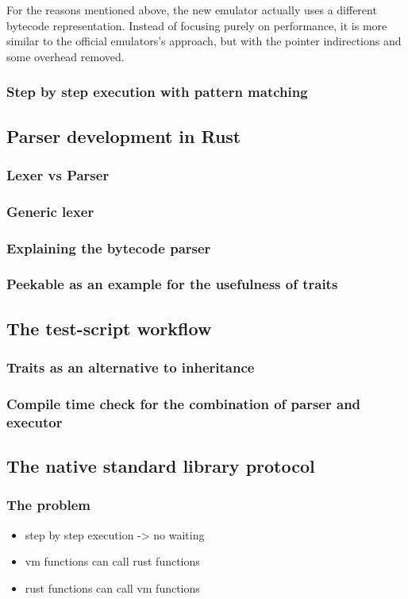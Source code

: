 For the reasons mentioned above, the new emulator actually uses a different bytecode representation. Instead of focusing purely on performance, it is more similar to the official emulators's approach, but with the pointer indirections and some overhead removed.

\subsubsection{Step by step execution with pattern matching}
\subsection{Parser development in Rust}
\subsubsection{Lexer vs Parser}
\subsubsection{Generic lexer}
\subsubsection{Explaining the bytecode parser}
\subsubsection{Peekable as an example for the usefulness of traits}
\subsection{The test-script workflow}
\subsubsection{Traits as an alternative to inheritance}
\subsubsection{Compile time check for the combination of parser and executor}
\subsection{The native standard library protocol} \label{jack-stdlib-in-rust}
\subsubsection{The problem}
\begin{itemize}
  \item step by step execution -> no waiting
  \item vm functions can call rust functions
  \item rust functions can call vm functions
\end{itemize}
